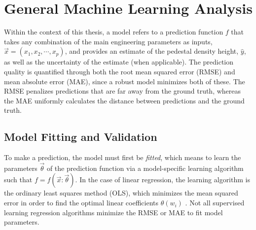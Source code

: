 \documentclass[a4paper, twoside, final, 12pt]{article}
\begin{document}
\section{General Machine Learning Analysis}\label{sec:principle-machine-learning-analysis}
Within the context of this thesis, a model refers to a prediction function $f$ that takes any combination of the main engineering parameters as inputs, $\vec{x} = (x_1, x_2, \cdots, x_p)$,  and provides an estimate of the pedestal density height, $\hat{y}$, as well as the uncertainty of the estimate (when applicable).
The prediction quality is quantified through both the root mean squared error (RMSE) and mean absolute error (MAE), since a robust model minimizes both of these.
The RMSE penalizes predictions that are far away from the ground truth, whereas the MAE uniformly calculates the distance between predictions and the ground truth.

\subsection{Model Fitting and Validation}
To make a prediction, the model must first be \textit{fitted}, which means to learn the parameters $\vec{\theta}$ of the prediction function via a model-specific learning algorithm such that $f = f(\vec{x}: \vec{\theta})$.
In the case of linear regression, the learning algorithm is the ordinary least squares method (OLS), which minimizes the mean squared error in order to find the optimal linear coefficients $\theta(w_i)$ \cite{OLS}.
Not all supervised learning regression algorithms minimize the RMSE or MAE to fit model parameters. 
\end{document}
